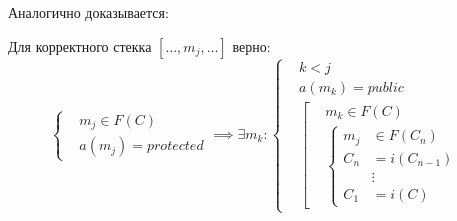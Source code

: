 \documentclass[graybox]{svmult}
\begin{document}
Аналогично доказывается:
\begin{theorem}
\label{method_before_protected}
Для корректного стекка $[\dots, m_j, \dots]$ верно:
\begin{equation}
	\left\{	
		\begin{aligned}
			&m_j \in F(C)\\
			&a(m_j) = protected
		\end{aligned}
	\right.
	\implies
	\exists m_k: 
	\left\{
    	\begin{aligned}
			&k < j \\
			&a(m_k) = public \\
			&\left[
        		\begin{aligned}
					& m_k \in F(C) \\
   					&\left\{
   						\begin{aligned}
	   						m_j &\in F(C_n) \\
	   						C_n &= i(C_{n-1}) \\
	   						&\vdots \\
	   						C_1 &= i(C)
   						\end{aligned}
   					\right.
				\end{aligned}
			\right.
		\end{aligned}
	\right.
\end{equation}
\end{theorem}
\end{document}

